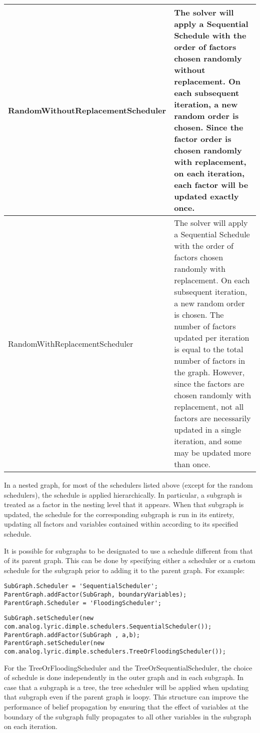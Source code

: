 \begin{longtable}{l p{4in}}
%
\textsf{RandomWithoutReplacementScheduler} & The solver will apply a Sequential Schedule with the order of factors chosen randomly without replacement.  On each subsequent iteration, a new random order is chosen.  Since the factor order is chosen randomly with replacement, on each iteration, each factor will be updated exactly once. \\ \hline
%
\textsf{RandomWithReplacementScheduler} & The solver will apply a Sequential Schedule with the order of factors chosen randomly with replacement.  On each subsequent iteration, a new random order is chosen.  The number of factors updated per iteration is equal to the total number of factors in the graph. However, since the factors are chosen randomly with replacement, not all factors are necessarily updated in a single iteration, and some may be updated more than once. \\ \hline
%
\end{longtable}


In a nested graph, for most of the schedulers listed above (except for the random schedulers), the schedule is applied hierarchically.  In particular, a subgraph is treated as a factor in the nesting level that it appears.  When that subgraph is updated, the schedule for the corresponding subgraph is run in its entirety, updating all factors and variables contained within according to its specified schedule.

It is possible for subgraphs to be designated to use a schedule different from that of its parent graph.  This can be done by specifying either a scheduler or a custom schedule for the subgraph prior to adding it to the parent graph.  For example:

\ifmatlab
\begin{lstlisting}
SubGraph.Scheduler = 'SequentialScheduler';
ParentGraph.addFactor(SubGraph, boundaryVariables);
ParentGraph.Scheduler = 'FloodingScheduler';
\end{lstlisting}
\fi

\ifjava
\begin{lstlisting}
SubGraph.setScheduler(new com.analog.lyric.dimple.schedulers.SequentialScheduler()); 
ParentGraph.addFactor(SubGraph , a,b); 
ParentGraph.setScheduler(new com.analog.lyric.dimple.schedulers.TreeOrFloodingScheduler());		
\end{lstlisting}
\fi

For the TreeOrFloodingScheduler and the TreeOrSequentialScheduler, the choice of schedule is done independently in the outer graph and in each subgraph.  In case that a subgraph is a tree, the tree scheduler will be applied when updating that subgraph even if the parent graph is loopy.  This structure can improve the performance of belief propagation by ensuring that the effect of variables at the boundary of the subgraph fully propagates to all other variables in the subgraph on each iteration.

